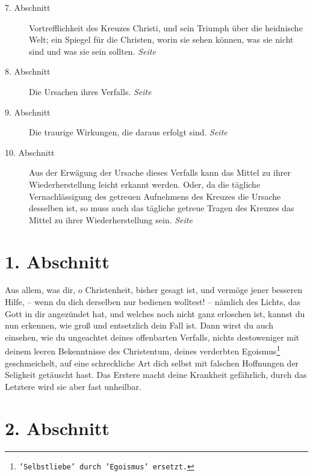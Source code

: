 \begin{description}
\item[7. Abschnitt] Vortrefflichkeit des Kreuzes Christi, und sein Triumph über
die heidnische Welt; ein Spiegel für die Christen, worin sie sehen können, was
sie nicht sind und was sie sein sollten.
\dotfill \textit{Seite~\pageref{kap2_ab7}}\\

\item[8. Abschnitt] Die Ursachen ihres Verfalls.
\dotfill \textit{Seite~\pageref{kap2_ab8}}\\

\item[9. Abschnitt] Die traurige Wirkungen, die daraus erfolgt sind.
\dotfill \textit{Seite~\pageref{kap2_ab9}}\\

\item[10. Abschnitt] Aus der Erwägung der Ursache dieses Verfalls kann das
Mittel zu ihrer Wiederherstellung leicht erkannt werden. Oder, da die tägliche
Vernachlässigung des getreuen Aufnehmens des Kreuzes die Ursache desselben ist,
so muss auch das tägliche getreue Tragen des Kreuzes das Mittel zu ihrer
Wiederherstellung sein.
\dotfill \textit{Seite~\pageref{kap2_ab10}}\\
\end{description}

\newpage

\section{1. Abschnitt}  \label{kap2_ab1}

Aus allem, was dir, o Christenheit, bisher gesagt ist, und vermöge jener
besseren
Hilfe, -- wenn du dich derselben nur bedienen wolltest! -- nämlich des Lichts,
das Gott in dir angezündet hat, und welches noch nicht ganz erloschen ist,
kannst du nun erkennen, wie groß und entsetzlich dein Fall ist. Dann wirst du
auch einsehen, wie du ungeachtet deines offenbarten Verfalls, nichts
destoweniger mit deinem leeren Bekenntnisse des Christentum, deines verderbten
Egoismus\footnote{\texttt{'Selbstliebe' durch 'Egoismus' ersetzt.}}
geschmeichelt,
auf eine schreckliche Art dich selbst mit
falschen Hoffnungen der Seligkeit getäuscht hast. Das Erstere macht deine
Krankheit gefährlich, durch das Letztere wird sie aber fast unheilbar.

\section{2. Abschnitt}  \label{kap2_ab2}

